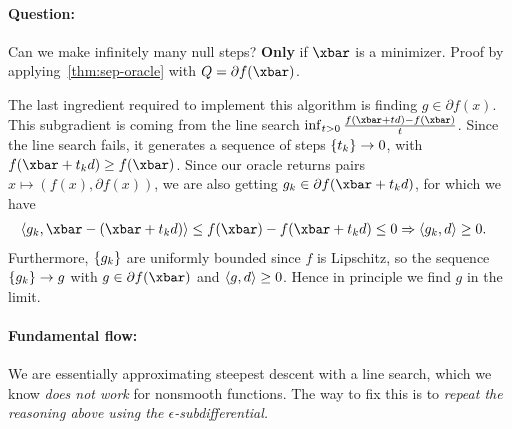 \paragraph{Question:} Can we make infinitely many null steps?
\textbf{Only} if $\xbar$ is a minimizer. Proof by
applying~\cref{thm:sep-oracle} with $Q = \partial f(\xbar)$.

The last ingredient required to implement this algorithm is finding $g \in
\partial f(x)$. This subgradient is coming from the line search $\inf_{t > 0}
\frac{f(\xbar + td) - f(\xbar)}{t}$. Since the line search fails, it generates
a sequence of steps $\left\{ t_k \right\} \to 0$, with $f(\xbar + t_k d) \geq f(\xbar)$.
Since our oracle returns pairs $x \mapsto (f(x), \partial f(x))$, we are also
getting $g_k \in \partial f(\xbar + t_k d)$, for which we have
\begin{align*}
	\ip{g_k, \xbar - (\xbar + t_k d)} &\leq f(\xbar) - f(\xbar + t_k d)
	\leq 0 \Rightarrow \ip{g_k, d} \geq 0.
\end{align*}
Furthermore, $\left\{ g_k \right\}$ are uniformly bounded since $f$ is Lipschitz, so the
sequence $\left\{ g_k \right\} \to g$ with $g \in \partial f(\xbar)$ and $\left\langle g, d \right\rangle \geq
0$.
Hence in principle we find $g$ in the limit.

\paragraph{Fundamental flow:} We are essentially approximating steepest descent
with a line search, which we know \textit{does not work} for nonsmooth functions.
The way to fix this is to \textit{repeat the reasoning above using the
$\epsilon$-subdifferential.}
